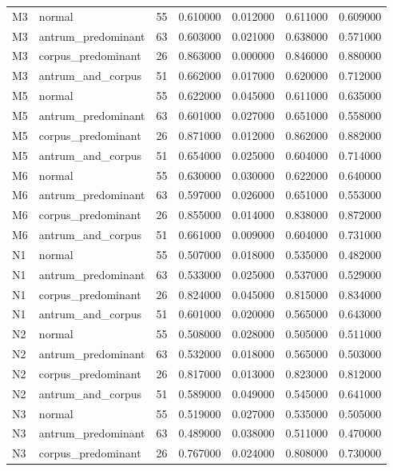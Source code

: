 \begin{table}
\begin{tabular}{llrrrrr}
M3 & normal & 55 & 0.610000 & 0.012000 & 0.611000 & 0.609000 \\
M3 & antrum\_predominant & 63 & 0.603000 & 0.021000 & 0.638000 & 0.571000 \\
M3 & corpus\_predominant & 26 & 0.863000 & 0.000000 & 0.846000 & 0.880000 \\
M3 & antrum\_and\_corpus & 51 & 0.662000 & 0.017000 & 0.620000 & 0.712000 \\
M5 & normal & 55 & 0.622000 & 0.045000 & 0.611000 & 0.635000 \\
M5 & antrum\_predominant & 63 & 0.601000 & 0.027000 & 0.651000 & 0.558000 \\
M5 & corpus\_predominant & 26 & 0.871000 & 0.012000 & 0.862000 & 0.882000 \\
M5 & antrum\_and\_corpus & 51 & 0.654000 & 0.025000 & 0.604000 & 0.714000 \\
M6 & normal & 55 & 0.630000 & 0.030000 & 0.622000 & 0.640000 \\
M6 & antrum\_predominant & 63 & 0.597000 & 0.026000 & 0.651000 & 0.553000 \\
M6 & corpus\_predominant & 26 & 0.855000 & 0.014000 & 0.838000 & 0.872000 \\
M6 & antrum\_and\_corpus & 51 & 0.661000 & 0.009000 & 0.604000 & 0.731000 \\
N1 & normal & 55 & 0.507000 & 0.018000 & 0.535000 & 0.482000 \\
N1 & antrum\_predominant & 63 & 0.533000 & 0.025000 & 0.537000 & 0.529000 \\
N1 & corpus\_predominant & 26 & 0.824000 & 0.045000 & 0.815000 & 0.834000 \\
N1 & antrum\_and\_corpus & 51 & 0.601000 & 0.020000 & 0.565000 & 0.643000 \\
N2 & normal & 55 & 0.508000 & 0.028000 & 0.505000 & 0.511000 \\
N2 & antrum\_predominant & 63 & 0.532000 & 0.018000 & 0.565000 & 0.503000 \\
N2 & corpus\_predominant & 26 & 0.817000 & 0.013000 & 0.823000 & 0.812000 \\
N2 & antrum\_and\_corpus & 51 & 0.589000 & 0.049000 & 0.545000 & 0.641000 \\
N3 & normal & 55 & 0.519000 & 0.027000 & 0.535000 & 0.505000 \\
N3 & antrum\_predominant & 63 & 0.489000 & 0.038000 & 0.511000 & 0.470000 \\
N3 & corpus\_predominant & 26 & 0.767000 & 0.024000 & 0.808000 & 0.730000 \\

\end{tabular}
\end{table}

